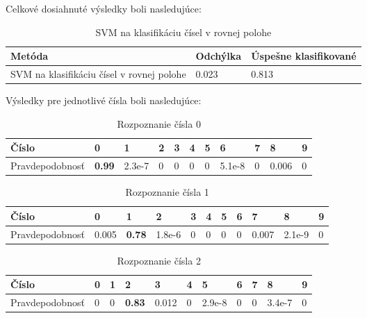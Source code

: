 Celkové dosiahnuté výsledky boli nasledujúce:

\begin{table}[H]
  \begin{tabular}{ | l | l | l |}
    \hline
    Metóda & Odchýlka & Úspešne klasifikované \\ \hline
    SVM na klasifikáciu čísel v rovnej polohe & 0.023 & 0.813 \\
    \hline
  \end{tabular}
  \caption[SVM na klasifikáciu čísel v rovnej polohe]{SVM na klasifikáciu čísel v rovnej polohe}
\end{table}

Výsledky pre jednotlivé čísla boli nasledujúce:

\begin{table}[H]
  \begin{tabular}{ | l | l | l | l | l | l | l | l | l | l | l |}
    \hline
    Číslo & 0 & 1 & 2 & 3 & 4 & 5 & 6 & 7 & 8 & 9 \\ \hline
    Pravdepodobnosť & \textbf{0.99} & 2.3e-7 & 0 & 0 & 0 & 0 & 5.1e-8 & 0 & 0.006 & 0 \\
    \hline
  \end{tabular}
  \caption[Rozpoznanie čísla 0]{Rozpoznanie čísla 0}
\end{table}

\begin{table}[H]
  \begin{tabular}{ | l | l | l | l | l | l | l | l | l | l | l |}
    \hline
    Číslo & 0 & 1 & 2 & 3 & 4 & 5 & 6 & 7 & 8 & 9 \\ \hline
    Pravdepodobnosť & 0.005 & \textbf{0.78} & 1.8e-6 & 0 & 0 & 0 & 0 & 0.007 & 2.1e-9 & 0 \\
    \hline
  \end{tabular}
  \caption[Rozpoznanie čísla 1]{Rozpoznanie čísla 1}
\end{table}

\begin{table}[H]
  \begin{tabular}{ | l | l | l | l | l | l | l | l | l | l | l |}
    \hline
    Číslo & 0 & 1 & 2 & 3 & 4 & 5 & 6 & 7 & 8 & 9 \\ \hline
    Pravdepodobnosť & 0 & 0 & \textbf{0.83} & 0.012 & 0 & 2.9e-8 & 0 & 0 & 3.4e-7 & 0 \\
    \hline
  \end{tabular}
  \caption[Rozpoznanie čísla 2]{Rozpoznanie čísla 2}
\end{table}

